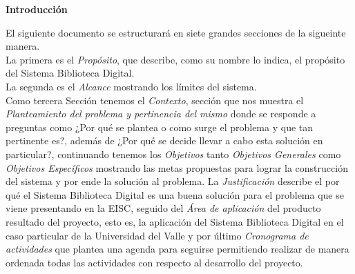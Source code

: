 %
%

\begin{center}
        \textbf{Introducción}
\end{center}

El siguiente documento se estructurará en siete grandes secciones de la sigueinte manera.\\

La primera es el \textit{Propósito}, que describe, como su nombre lo indica, el propósito del
Sistema Biblioteca Digital.\\

La segunda es el \textit{Alcance} mostrando los límites del sistema.\\

Como tercera Sección tenemos el \textit{Contexto}, sección que nos muestra el \textit{Planteamiento
del problema y pertinencia del mismo} donde se responde a preguntas como ¿Por qué se plantea o como
surge el problema y que tan pertinente es?, además de ¿Por qué se decide llevar a cabo esta
solución en particular?, continuando tenemos los \textit{Objetivos} tanto \textit{Objetivos
Generales} como \textit{Objetivos Específicos} mostrando las metas propuestas para lograr la
construcción del sistema y por ende la solución al problema. La \textit{Justificación} describe el
por qué el Sistema Biblioteca Digital es una buena solución para el problema que se viene
presentando en la EISC, seguido del \textit{Área de aplicación} del producto resultado del
proyecto, esto es, la aplicación del Sistema Biblioteca Digital en el caso particular de la
Universidad del Valle y por último \textit{Cronograma de actividades} que plantea una agenda para
seguirse permitiendo realizar de manera ordenada todas las actividades con respecto al desarrollo
del proyecto.\\
 
